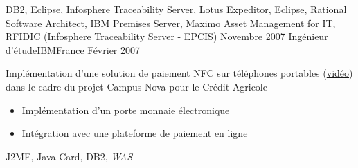 \begin{experiences}
{                    }
                    {
                      DB2, Eclipse, Infosphere Traceability Server, Lotus Expeditor, Eclipse, 
                      Rational Software Architect, IBM Premises Server, Maximo Asset Management for IT, RFIDIC (Infosphere Traceability Server - EPCIS)
                    }
  \emptySeparator
  \experience
  {Novembre 2007}  {Ingénieur d'étude}{IBM}{France}
  {Février 2007}   {
                      Implémentation d'une solution de paiement NFC sur téléphones portables (\href{http://www.nouvo.ch/s-007}{vidéo}) 
                      dans le cadre du projet Campus Nova pour le Crédit Agricole  
                      \begin{itemize}
                        \item Implémentation d'un porte monnaie électronique                                            
                        \item Intégration avec une plateforme de paiement en ligne  
                      \end{itemize}
                  }
                  {J2ME, Java Card, DB2, \emph{WAS}}  
\end{experiences}

